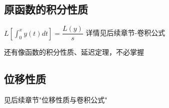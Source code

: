 \vspace{-1cm}

\subsection{原函数的积分性质}

\begin{center}
	$L\left\lbrack\int_{0}^{x}y\left(t\right)dt\right\rbrack=\dfrac{L\left(y\right)}{s}$  \hspace{2em}
	详情见后续章节-卷积公式
	
	\vspace{10pt}
	
	还有像函数的积分性质、延迟定理，不必掌握
\end{center}

\subsection{位移性质}

见后续章节"位移性质与卷积公式"





